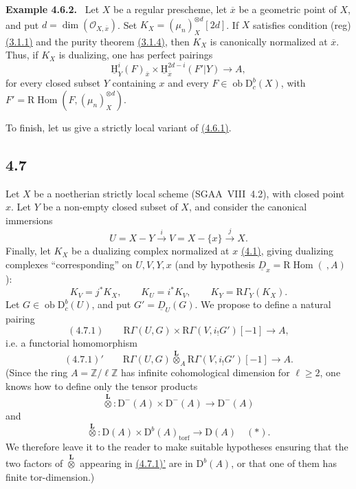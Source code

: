 \documentclass[11pt]{article}
\providecommand{\cO}{\mathcal{O}}
\providecommand{\uH}{\underline{\mathrm H}}
\newenvironment{statement}[1]{\par\medskip\noindent\textbf{#1.}\ }{\par\medskip}
\DeclareMathOperator{\Hom}{Hom}
\newcommand{\R}{\mathrm{R}}
\newcommand{\D}{\mathrm{D}}
\newcommand{\Z}{\mathbb{Z}}
\newcommand{\ob}{\operatorname{ob}}
\newcommand{\ol}[1]{\overline{#1}}
\providecommand{\Hom}{\operatorname{Hom}}
\providecommand{\ob}{\operatorname{ob}}
\providecommand{\R}{\mathrm R}
\providecommand{\Z}{\mathbb Z}
\providecommand{\Hom}{\operatorname{Hom}}
\begin{document}
\label{sga5:I:example:4.6.2}\begin{statement}{Example 4.6.2}
Let $X$ be a regular prescheme, let $\ol{x}$ be a geometric point of $X$, and put $d=\dim(\cO_{X,\ol{x}})$. Set $K_X=(\mu_n)_X^{\otimes d}[2d]$. If $X$ satisfies condition (reg) \hyperref[sga5:I:statement:3.1.1]{(3.1.1)} and the purity theorem \hyperref[sga5:I:statement:3.1.4]{(3.1.4)}, then $K_X$ is canonically normalized at $\ol{x}$. Thus, if $K_X$ is dualizing, one has perfect pairings
\[
\uH_Y^i(F)_{\ol{x}}\times \uH_{\ol{x}}^{2d-i}(F'|Y)\longrightarrow A,
\]
for every closed subset $Y$ containing $x$ and every $F\in\ob\D_c^b(X)$, with $F'=\R\Hom(F,(\mu_n)_X^{\otimes d})$.
\end{statement}

To finish, let us give a strictly local variant of \hyperref[sga5:I:equation:4.6.1]{(4.6.1)}.

\subsection*{4.7}\label{sga5:I:subsection:4.7}
Let $X$ be a noetherian strictly local scheme (SGAA~VIII~4.2), with closed point $x$. Let $Y$ be a non-empty closed subset of $X$, and consider the canonical immersions
\[
U=X-Y\xrightarrow{i}V=X-\{x\}\xrightarrow{j}X.
\]
Finally, let $K_X$ be a dualizing complex normalized at $x$ \hyperref[sga5:I:equation:4.1]{(4.1)}, giving dualizing complexes ``corresponding'' on $U,V,Y,x$ (and by hypothesis $\underline{D}_x=\R\Hom(\ ,A)$):
\[
K_V=j^*K_X,
\qquad K_U=i^*K_V,
\qquad K_Y=\R\Gamma_Y(K_X).
\]
Let $G\in\ob\D_c^b(U)$, and put $G'=\underline{D}_U(G)$. We propose to define a natural pairing
\label{sga5:I:equation:4.7.1}\[
(4.7.1)\qquad \R\Gamma(U,G)\times \R\Gamma(V,i_!G')[-1]\longrightarrow A,
\]
i.e. a functorial homomorphism
\label{sga5:I:equation:4.7.1:2}\[
(4.7.1)'\qquad \R\Gamma(U,G)\overset{\mathbf L}{\otimes}_A\R\Gamma(V,i_!G')[-1]\longrightarrow A.
\]
(Since the ring $A=\Z/\ell\Z$ has infinite cohomological dimension for $\ell\geqslant2$, one knows how to define only the tensor products
\[
\overset{\mathbf L}{\otimes}:\D^-(A)\times\D^-(A)\longrightarrow\D^-(A)
\]
and
\[
\overset{\mathbf L}{\otimes}:\D(A)\times\D^b(A)_{\mathrm{torf}}\longrightarrow\D(A)\quad(*).
\]
We therefore leave it to the reader to make suitable hypotheses ensuring that the two factors of $\overset{\mathbf L}{\otimes}$ appearing in \hyperref[sga5:I:equation:4.7.1:2]{(4.7.1)'} are in $\D^b(A)$, or that one of them has finite tor-dimension.)
\end{document}
